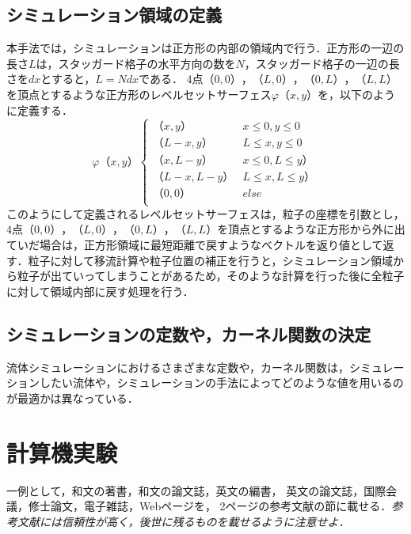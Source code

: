 \documentclass[a4j,12pt]{jreport}
\begin{document}
\section{シミュレーション領域の定義} \label{sec:levelsetserface}
本手法では，シミュレーションは正方形の内部の領域内で行う．正方形の一辺の長さ$L$は，スタッガード格子の水平方向の数を$N$，スタッガード格子の一辺の長さを$dx$とすると，$L = Ndx$である．
4点$（0,0），（L,0），（0,L），（L,L）$を頂点とするような正方形のレベルセットサーフェス$\varphi（x,y）$を，以下のように定義する．
\begin{equation}\label{eq:levelsetserface}
\varphi（x,y）
\begin{cases}
（x,y） & x \le0 , y \le 0\\
（L - x,y） & L \le x , y \le 0\\
（x,L-y） & x \le0 , L \le y）\\
（L-x,L-y） & L \le x , L \le y）\\
（0,0） & else\\
\end{cases}
\end{equation} 
このようにして定義されるレベルセットサーフェスは，粒子の座標を引数とし，4点$（0,0），（L,0），（0,L），（L,L）$を頂点とするような正方形から外に出ていだ場合は，正方形領域に最短距離で戻すようなベクトルを返り値として返す．粒子に対して移流計算や粒子位置の補正を行うと，シミュレーション領域から粒子が出ていってしまうことがあるため，そのような計算を行った後に全粒子に対して領域内部に戻す処理を行う．

\section{シミュレーションの定数や，カーネル関数の決定} \label{sec:constant}
流体シミュレーションにおけるさまざまな定数や，カーネル関数は，シミュレーションしたい流体や，シミュレーションの手法によってどのような値を用いるのが最適かは異なっている．
\chapter{計算機実験} \label{chapter:5}

一例として，和文の著書\cite{suetake}，和文の論文誌\cite{kusano}，英文の編書\cite{fuortes}，
英文の論文誌\cite{rice}，国際会議\cite{guibas}，修士論文\cite{chudai}，電子雑誌\cite{iwama}，Webページ\cite{IPSJ}を，
2ページの参考文献の節に載せる．{\em 参考文献には信頼性が高く，後世に残るものを載せるように注意せよ．}
\end{document}

